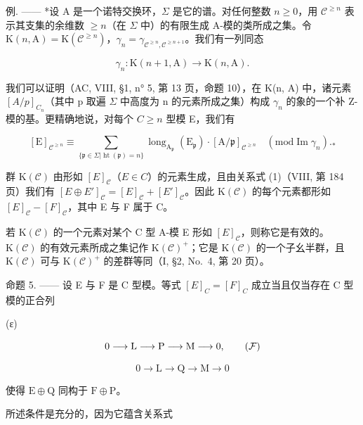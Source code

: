 例. —— *设 A 是一个诺特交换环，\(\Sigma\) 是它的谱。对任何整数 \(n \geqslant 0\)，用 \(\mathcal{C}^{\geqslant n}\) 表示其支集的余维数 \(\geqslant n\)（在 \(\Sigma\) 中）的有限生成 A-模的类所成之集。令 \(\mathrm{K}(n,\mathrm{A}) = \mathrm{K}(\mathcal{C}^{\geqslant n})\)，\(\gamma_{n} = \gamma_{\mathcal{C}^{\geqslant n},\mathcal{C}^{\geqslant n + 1}}\)。我们有一列同态

\[
\gamma_ {n}: \mathrm{K} (n + 1, \mathrm{A}) \longrightarrow \mathrm{K} (n, \mathrm{A}).
\]

我们可以证明（AC, VIII, §1, n° 5, 第 13 页，命题 10），在 K(n, A) 中，诸元素 \([A/p]_{C_{n}}\)（其中 p 取遍 \(\Sigma\) 中高度为 n 的元素所成之集）构成 \(\gamma_{n}\) 的象的一个补 Z-模的基。更精确地说，对每个 \(C \geqslant n\) 型模 E，我们有

\[
[ \mathrm{E} ] _ {\mathcal {C} ^ {\geqslant n}} \equiv \sum_ {\{\mathfrak {p} \in \Sigma | \operatorname{ht} (\mathfrak {p}) = n \}} \operatorname{long} _ {\mathrm{A} _ {\mathfrak {p}}} (\mathrm{E} _ {\mathfrak {p}}) \cdot [ \mathrm{A} / \mathfrak {p} ] _ {\mathcal {C} ^ {\geqslant n}} \quad (\mathrm{mod} \operatorname{Im} \gamma_ {n}). _ {*}
\]

群 \(\mathrm{K}(\mathcal{C})\) 由形如 \([E]_{\mathcal{C}}\)（\(E \in C\)）的元素生成，且由关系式 (1)（VIII, 第 184 页）我们有 \([E \oplus E']_{\mathcal{C}} = [E]_{\mathcal{C}} + [E']_{\mathcal{C}}\)。因此 \(\mathrm{K}(\mathcal{C})\) 的每个元素都形如 \([E]_{\mathcal{C}} - [F]_{\mathcal{C}}\)，其中 E 与 F 属于 C。

若 \(\mathrm{K}(\mathcal{C})\) 的一个元素对某个 C 型 A-模 E 形如 \([E]_{\mathcal{C}}\)，则称它是有效的。\(\mathrm{K}(\mathcal{C})\) 的有效元素所成之集记作 \(\mathrm{K}(\mathcal{C})^{+}\)；它是 \(\mathrm{K}(\mathcal{C})\) 的一个子幺半群，且 \(\mathrm{K}(\mathcal{C})\) 可与 \(\mathrm{K}(\mathcal{C})^{+}\) 的差群等同（I, §2, No.~4, 第 20 页）。

命题 5. —— 设 E 与 F 是 C 型模。等式 \([E]_{C} = [F]_{C}\) 成立当且仅当存在 C 型模的正合列

(ε)

\[
0 \longrightarrow \mathrm{L} \longrightarrow \mathrm{P} \longrightarrow \mathrm{M} \longrightarrow 0,\tag{\( \mathcal{F} \)}
\]

\[
0 \longrightarrow \mathrm{L} \longrightarrow \mathrm{Q} \longrightarrow \mathrm{M} \longrightarrow 0
\]

使得 \(\mathrm{E} \oplus \mathrm{Q}\) 同构于 \(\mathrm{F} \oplus \mathrm{P}\)。

所述条件是充分的，因为它蕴含关系式

